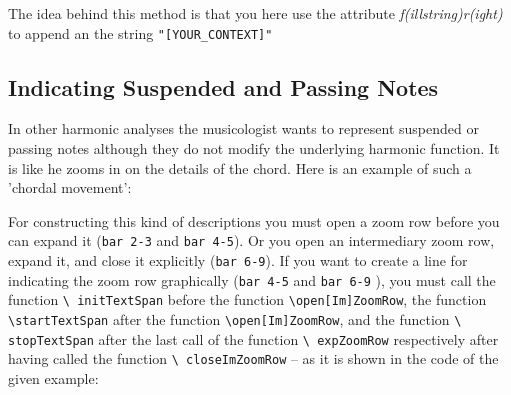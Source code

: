 \documentclass[
  DIV=calc,
  BCOR=5mm,
  12pt,
  headings=small,
  oneside,
  abstract=true,
  toc=bib,
  xcolor=dvipsnames,
  openany,
  ngerman,english]{scrartcl}
\newcommand{\acc}[0]{\textit}
\begin{document}
The idea behind this method is that you here use the attribute
\acc{f(illstring)r(ight)} to append an the string \texttt{"[YOUR\_CONTEXT]"} 

\subsection{Indicating Suspended and Passing Notes}

In other harmonic analyses the musicologist wants to represent suspended or
passing notes although they do not modify the underlying harmonic function. It
is like he zooms in on the details of the chord. Here is an example of such a
'chordal movement':

\begin{center}
\end{center}

For constructing this kind of descriptions you must open a zoom row before you
can expand it (\texttt{bar 2-3} and \texttt{bar 4-5}). Or you open an
intermediary zoom row, expand it, and close it explicitly (\texttt{bar 6-9}). If
you want to create a line for indicating the zoom row graphically (\texttt{bar
4-5} and \texttt{bar 6-9} ), you must call the function \texttt{\textbackslash
initTextSpan} before the function \texttt{\textbackslash open[Im]ZoomRow}, the
function \texttt{\textbackslash startTextSpan} after the function
\texttt{\textbackslash open[Im]ZoomRow}, and the function \texttt{\textbackslash
stopTextSpan} after the last call of the function \texttt{\textbackslash
expZoomRow} respectively after having called the function \texttt{\textbackslash
closeImZoomRow} -- as it is shown in the code of the given example:
\end{document}
